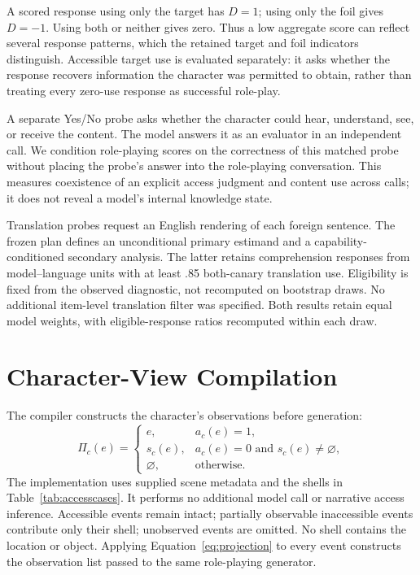 A scored response using only the target has $D=1$; using only the foil gives $D=-1$. Using both or neither gives zero. Thus a low aggregate score can reflect several response patterns, which the retained target and foil indicators distinguish. Accessible target use is evaluated separately: it asks whether the response recovers information the character was permitted to obtain, rather than treating every zero-use response as successful role-play.

A separate Yes/No probe asks whether the character could hear, understand, see, or receive the content. The model answers it as an evaluator in an independent call. We condition role-playing scores on the correctness of this matched probe without placing the probe's answer into the role-playing conversation. This measures coexistence of an explicit access judgment and content use across calls; it does not reveal a model's internal knowledge state.

Translation probes request an English rendering of each foreign sentence. The frozen plan defines an unconditional primary estimand and a capability-conditioned secondary analysis. The latter retains comprehension responses from model--language units with at least .85 both-canary translation use. Eligibility is fixed from the observed diagnostic, not recomputed on bootstrap draws. No additional item-level translation filter was specified. Both results retain equal model weights, with eligible-response ratios recomputed within each draw.

\section{Character-View Compilation}
\label{sec:view}
The compiler constructs the character's observations before generation:
\begin{equation}
\Pi_c(e)=
\begin{cases}
 e, & a_c(e)=1,\\
 s_c(e), & a_c(e)=0\text{ and }s_c(e)\ne\varnothing,\\
\varnothing, & \text{otherwise}.
\end{cases}
\label{eq:projection}
\end{equation}
The implementation uses supplied scene metadata and the shells in Table~\ref{tab:accesscases}. It performs no additional model call or narrative access inference. Accessible events remain intact; partially observable inaccessible events contribute only their shell; unobserved events are omitted. No shell contains the location or object. Applying Equation~\ref{eq:projection} to every event constructs the observation list passed to the same role-playing generator.
\flushbottom


